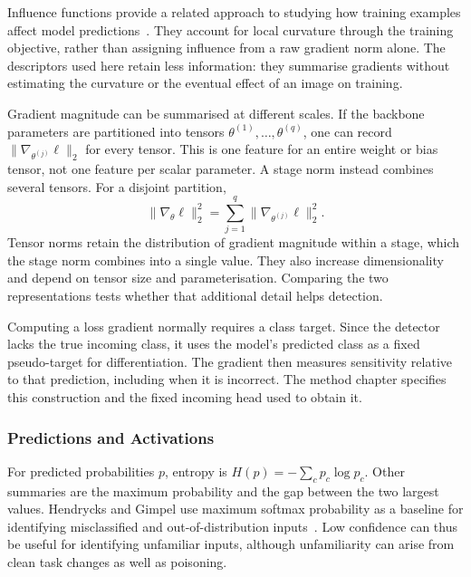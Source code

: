 Influence functions provide a related approach to studying how training
examples affect model predictions~\cite{koh2017influence}. They account
for local curvature through the training objective, rather than assigning
influence from a raw gradient norm alone. The descriptors used here retain
less information: they summarise gradients without estimating the curvature
or the eventual effect of an image on training.

Gradient magnitude can be summarised at different scales. If the backbone parameters are
partitioned into tensors $\theta^{(1)},\ldots,\theta^{(q)}$, one can record
$\|\nabla_{\theta^{(j)}}\ell\|_2$ for every tensor. This is one feature for
an entire weight or bias tensor, not one feature per scalar parameter. A
stage norm instead combines several tensors. For a disjoint partition,
\begin{equation}
 \|\nabla_\theta\ell\|_2^2
 =\sum_{j=1}^{q}\|\nabla_{\theta^{(j)}}\ell\|_2^2.
 \label{eq:bg-gradient-partition}
\end{equation}
Tensor norms retain the distribution of gradient magnitude within a stage,
which the stage norm combines into a single value. They also increase
dimensionality and depend on tensor size and parameterisation. Comparing
the two representations tests whether that additional detail helps detection.

Computing a loss gradient normally requires a class target. Since the
detector lacks the true incoming class, it uses the model's predicted class
as a fixed pseudo-target for differentiation. The gradient then measures
sensitivity relative to that prediction, including when it is incorrect.
The method chapter specifies this construction and the fixed incoming head
used to obtain it.

\begin{samepage}
\subsubsection{Predictions and Activations}

For predicted probabilities $p$, entropy is
\mbox{$H(p)=-\sum_c p_c\log p_c$}. Other summaries are the maximum probability
and the gap between the two largest values. Hendrycks and Gimpel use maximum
softmax probability as a baseline for identifying misclassified and
out-of-distribution inputs~\cite{hendrycks2017baseline}. Low confidence
can thus be useful for identifying unfamiliar inputs, although unfamiliarity
can arise from clean task changes as well as poisoning.
\par
\end{samepage}

